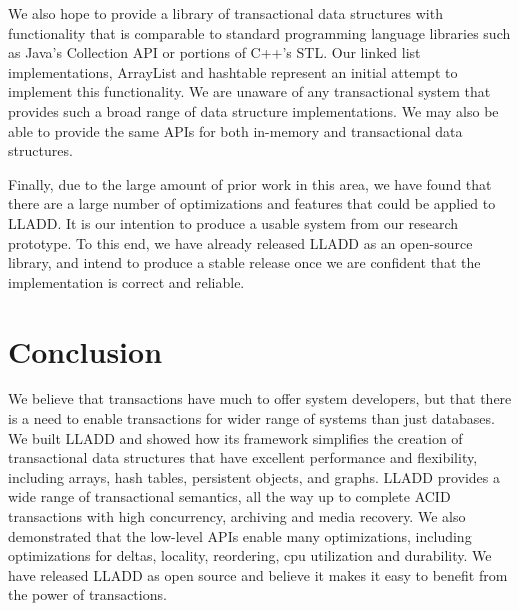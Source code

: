 \documentclass[10pt,letterpaper,twocolumn,english]{article}
\newcommand{\yad}{LLADD\xspace}
\begin{document}
We also hope to provide a library of transactional data structures
with functionality that is comparable to standard programming language
libraries such as Java's Collection API or portions of C++'s STL.  Our
linked list implementations, ArrayList and hashtable represent an
initial attempt to implement this functionality.  We are unaware of
any transactional system that provides such a broad range of data
structure implementations.  We may also be able to provide the same
APIs for both in-memory and transactional data structures.



Finally, due to the large amount of prior work in this area, we have
found that there are a large number of optimizations and features that
could be applied to \yad.  It is our intention to produce a usable
system from our research prototype.  To this end, we have already
released \yad as an open-source library, and intend to produce a
stable release once we are confident that the implementation is correct
and reliable.  


\section{Conclusion}

We believe that transactions have much to offer system developers, but
that there is a need to enable transactions for wider range of systems
than just databases.  We built \yad and showed how its framework
simplifies the creation of transactional data structures that have
excellent performance and flexibility, including arrays, hash tables,
persistent objects, and graphs.  \yad provides a wide range of
transactional semantics, all the way up to complete ACID transactions with
high concurrency, archiving and media recovery.  We also demonstrated
that the low-level APIs enable many optimizations, including
optimizations for deltas, locality, reordering, cpu utilization and durability.  We
have released \yad as open source and believe it makes it easy to
benefit from the power of transactions.
\end{document}
